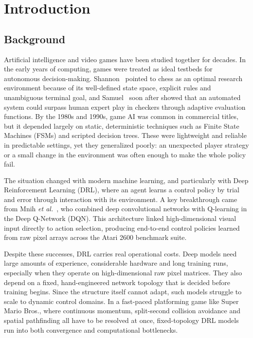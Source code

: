 \chapter{Introduction}
\label{ch:introduction}
 
\section{Background}
\label{sec:background}

Artificial intelligence and video games have been studied together for decades.
In the early years of computing, games were treated as ideal testbeds for
autonomous decision-making. Shannon~\cite{shannon1950} pointed to chess as an optimal
research environment because of its well-defined state space, explicit rules and
unambiguous terminal goal, and Samuel~\cite{samuel1959} soon after showed that an
automated system could surpass human expert play in checkers through adaptive
evaluation functions. By the 1980s and 1990s, game AI was common in commercial
titles, but it depended largely on static, deterministic techniques such as
Finite State Machines (FSMs) and scripted decision trees. These were
lightweight and reliable in predictable settings, yet they generalized poorly:
an unexpected player strategy or a small change in the environment was often
enough to make the whole policy fail.

\noindent
The situation changed with modern machine learning, and particularly with Deep
Reinforcement Learning (DRL), where an agent learns a control policy by
trial and error through interaction with its environment. A key breakthrough
came from Mnih \emph{et al.}~\cite{mnih2015}, who combined deep convolutional networks with
Q-learning in the Deep Q-Network (DQN). This architecture linked
high-dimensional visual input directly to action selection, producing
end-to-end control policies learned from raw pixel arrays across the Atari 2600
benchmark suite.

\noindent
Despite these successes, DRL carries real operational costs. Deep models need
large amounts of experience, considerable hardware and long training runs,
especially when they operate on high-dimensional raw pixel matrices. They also
depend on a fixed, hand-engineered network topology that is decided before
training begins. Since the structure itself cannot adapt, such models struggle
to scale to dynamic control domains. In a fast-paced platforming game like
Super Mario Bros., where continuous momentum, split-second collision avoidance
and spatial pathfinding all have to be resolved at once, fixed-topology DRL
models run into both convergence and computational bottlenecks.

